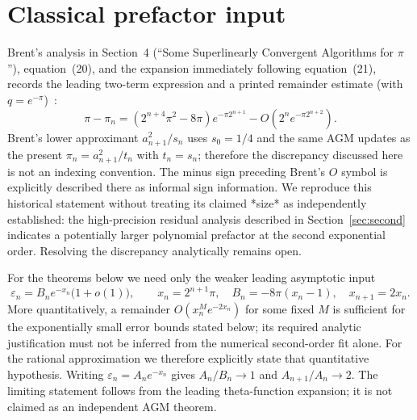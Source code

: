 \documentclass[11pt]{article}
\theoremstyle{definition}\newtheorem{remark}{Remark}\newtheorem{observation}{Numerical Observation}
\begin{document}
\section{Classical prefactor input}
Brent's analysis in Section~4 (``Some Superlinearly Convergent Algorithms for $\pi$''), equation~(20), and the expansion immediately following equation~(21), records the leading two-term expression and a printed remainder estimate (with $q=e^{-\pi}$)~\cite{brent2020}:
\begin{equation}\label{eq:brent-printed}
\pi-\pi_n=(2^{n+4}\pi^2-8\pi)e^{-\pi 2^{n+1}}
-O\!\left(2^n e^{-\pi 2^{n+2}}\right).
\end{equation}
Brent's lower approximant $a_{n+1}^{2}/s_n$ uses $s_0=1/4$ and the same AGM updates as the present $\pi_n=a_{n+1}^{2}/t_n$ with $t_n=s_n$; therefore the discrepancy discussed here is not an indexing convention. The minus sign preceding Brent's $O$ symbol is explicitly described there as informal sign information. We reproduce this historical statement without treating its claimed *size* as independently established: the high-precision residual analysis described in Section~\ref{sec:second} indicates a potentially larger polynomial prefactor at the second exponential order. Resolving the discrepancy analytically remains open.

For the theorems below we need only the weaker leading asymptotic input
\begin{equation}\label{eq:error}
\varepsilon_n=B_n e^{-x_n}\bigl(1+o(1)\bigr),\qquad
x_n=2^{n+1}\pi,\quad B_n=-8\pi(x_n-1),\quad x_{n+1}=2x_n.
\end{equation}
More quantitatively, a remainder $O(x_n^M e^{-2x_n})$ for some fixed $M$ is sufficient for the exponentially small error bounds stated below; its required analytic justification must not be inferred from the numerical second-order fit alone. For the rational approximation we therefore explicitly state that quantitative hypothesis.
Writing $\varepsilon_n=A_n e^{-x_n}$ gives $A_n/B_n\to1$ and $A_{n+1}/A_n\to2$. The limiting statement follows from the leading theta-function expansion; it is not claimed as an independent AGM theorem.
\end{document}
